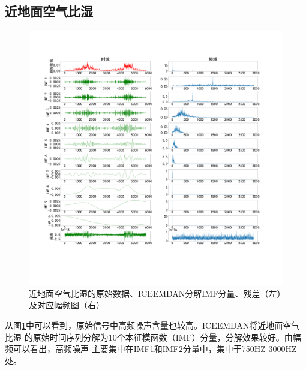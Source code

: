\documentclass[AutoFakeBold]{LZUThesis}
\begin{document}
\subsection{近地面空气比湿}
\begin{figure}[H]
	\centering
    \includegraphics[width=1\textwidth]{figures/shum.pdf}
    \caption{近地面空气比湿的原始数据、ICEEMDAN分解IMF分量、残差（左）及对应幅频图（右）}
    \label{fig_shum}
\end{figure}

从图\ref{fig_shum}中可以看到，原始信号中高频噪声含量也较高。ICEEMDAN将近地面空气比湿
的原始时间序列分解为10个本征模函数（IMF）分量，分解效果较好。由幅频可以看出，高频噪声
主要集中在IMF1和IMF2分量中，集中于750HZ-3000HZ处。
\end{document}
